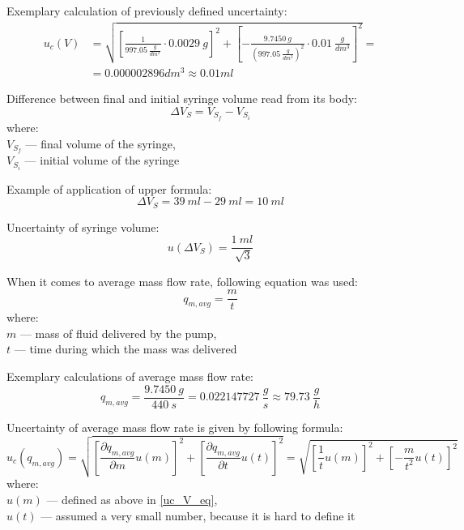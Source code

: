 \documentclass[12pt,a4paper]{article}
\begin{document}
	Exemplary calculation of previously defined uncertainty:
	\begin{equation}\label{uc_V_eq_eg}
	\begin{split}
		u_c(V) & = \sqrt{\left[\frac{1}{997.05~\frac{g}{dm^3}} \cdot 0.0029~g\right]^2 + \left[-\frac{9.7450~g}{(997.05~\frac{g}{dm^3})^2}\cdot 0.01~\frac{g}{dm^3}\right]^2}=\\
		& = 0.000002896 dm^3 \approx 0.01 ml
	\end{split}
	\end{equation}
	
	Difference between final and initial syringe volume read from its body:
	\begin{equation}\label{diff_Vs_eq}
		\Delta V_S = V_{S_f} - V_{S_i}
	\end{equation}
	\small
	where: \\
	\indent\indent $V_{S_f}$ — final volume of the syringe,\\
	\indent\indent $V_{S_i}$ — initial volume of the syringe
	\normalsize
	\newline
	
	Example of application of upper formula:
	\begin{equation}\label{diff_Vs_eg_eq}
		\Delta V_S = 39~ml - 29~ml = 10~ml	
	\end{equation}
	
	Uncertainty of syringe volume:
	\begin{equation}\label{uc_diff_Vs_eq}
		u(\Delta V_S) = \frac{1~ml}{\sqrt[]{3}}
	\end{equation}
	
	When it comes to average mass flow rate, following equation was used:
	\begin{equation}\label{qm,avg_eq}
		q_{m,avg} = \frac{m}{t}
	\end{equation}
	\small{
	where: \\
	\indent\indent $m$ — mass of fluid delivered by the pump,\\
	\indent\indent $t$ — time during which the mass was delivered
	}
	\normalsize
	\newline
	
	Exemplary calculations of average mass flow rate:
	\begin{equation}\label{qm,avg_eg_eq}
		q_{m,avg} = \frac{9.7450~g}{440~s} = 0.022147727~\frac{g}{s} \approx 79.73 ~\frac{g}{h}
	\end{equation}
	
	Uncertainty of average mass flow rate is given by following formula:
	\begin{equation}\label{uc_qm,avg_eq}
		u_c(q_{m,avg}) = \sqrt{\left[\frac{\partial q_{m,avg}}{\partial m} u(m)\right]^2 + \left[\frac{\partial q_{m,avg}}{\partial t} u(t)\right]^2} = \sqrt{\left[\frac{1}{t} u(m)\right]^2 + \left[-\frac{m}{t^2} u(t)\right]^2}
	\end{equation}
	\small{
	where: \\
	\indent\indent $u(m)$ — defined as above in \ref{uc_V_eq},\\
	\indent\indent $u(t)$ — assumed a very small number, because it is hard to define it
	}
	\normalsize
	\newline
	
\end{document}
